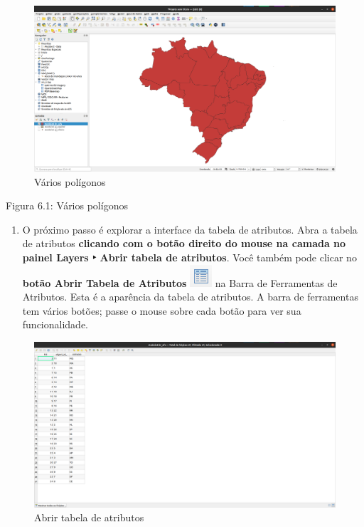 \documentclass[
]{book}
\providecommand{\tightlist}{%
  \setlength{\itemsep}{0pt}\setlength{\parskip}{0pt}}
\begin{document}
\begin{figure}
\centering
\includegraphics{media/modulo6/many-polygons.png}
\caption{Vários polígonos}
\end{figure}

Figura 6.1: Vários polígonos

\begin{enumerate}
\def\labelenumi{\arabic{enumi}.}
\setcounter{enumi}{1}
\tightlist
\item
  O próximo passo é explorar a interface da tabela de atributos. Abra a tabela de atributos \textbf{clicando com o botão direito do mouse na camada no painel Layers ‣ Abrir tabela de atributos}. Você também pode clicar no \textbf{botão Abrir Tabela de Atributos} \includegraphics{media/modulo6/open-attribute-btn.png} na Barra de Ferramentas de Atributos. Esta é a aparência da tabela de atributos. A barra de ferramentas tem vários botões; passe o mouse sobre cada botão para ver sua funcionalidade.
\end{enumerate}

\begin{figure}
\centering
\includegraphics{media/modulo6/attribute-tab.png}
\caption{Abrir tabela de atributos}
\end{figure}
\end{document}
